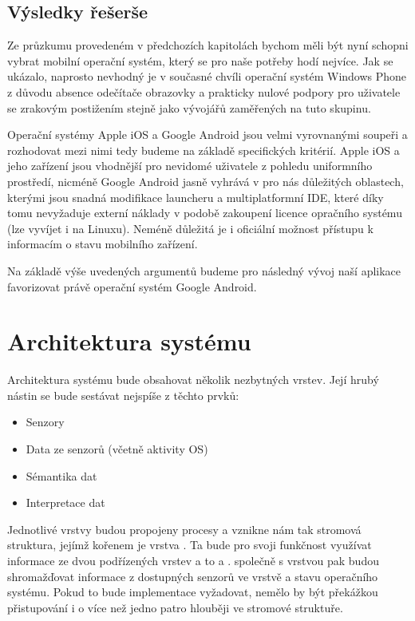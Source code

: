 \documentclass[thesis=M,czech]{FITthesis}[2012/06/26]
\begin{document}
\subsection{Výsledky řešerše}
Ze průzkumu provedeném v předchozích kapitolách bychom měli být nyní schopni vybrat mobilní operační systém, který se pro naše potřeby hodí nejvíce. Jak se ukázalo, naprosto nevhodný je v současné chvíli operační systém Windows Phone z důvodu absence odečítače obrazovky a prakticky nulové podpory pro uživatele se zrakovým postižením stejně jako vývojářů zaměřených na tuto skupinu.

Operační systémy Apple iOS a Google Android jsou velmi vyrovnanými soupeři a rozhodovat mezi nimi tedy budeme na základě specifických kritérií. Apple iOS a jeho zařízení jsou vhodnější pro nevidomé uživatele z pohledu uniformního prostředí, nicméně Google Android jasně vyhrává v pro nás důležitých oblastech, kterými jsou snadná modifikace launcheru a multiplatformní IDE, které díky tomu nevyžaduje externí náklady v podobě zakoupení licence opračního systému (lze vyvíjet i na Linuxu). Neméně důležitá je i oficiální možnost přístupu k informacím o stavu mobilního zařízení.

Na základě výše uvedených argumentů budeme pro následný vývoj naší aplikace favorizovat právě operační systém Google Android.

\section{Architektura systému}\label{architecture}
Architektura systému bude obsahovat několik nezbytných vrstev. Její hrubý nástin se bude sestávat nejspíše z těchto prvků:

\begin{itemize}
\item    Senzory
\item    Data ze senzorů (včetně aktivity OS)
\item    Sémantika dat
\item    Interpretace dat
\end{itemize}

Jednotlivé vrstvy budou propojeny procesy a vznikne nám tak stromová struktura, jejímž kořenem je vrstva . Ta bude pro svoji funkčnost využívat informace ze dvou podřízených vrstev a to  a .  společně s vrstvou  pak budou shromažďovat informace z dostupných senzorů ve vrstvě  a stavu operačního systému. Pokud to bude implementace vyžadovat, nemělo by být překážkou přistupování i o více než jedno patro hlouběji ve stromové struktuře.
\end{document}
